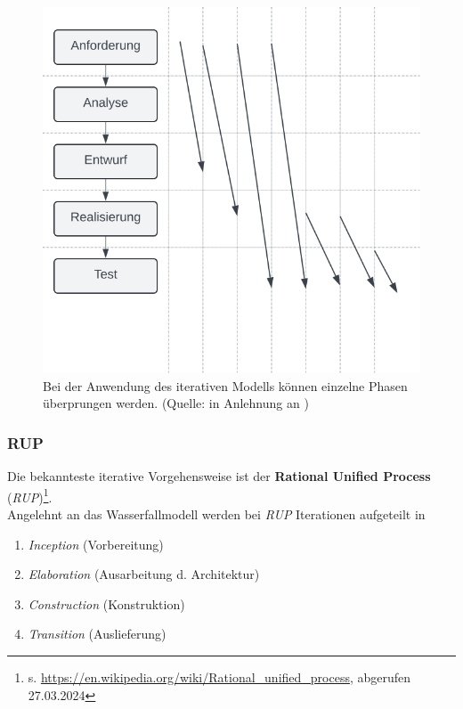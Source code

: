 \begin{figure}
    \centering
    \includegraphics[scale=0.4]{chapters/Prozessmodelle/img/iterativ}
    \caption{Bei der Anwendung des iterativen Modells können einzelne Phasen überprungen werden. (Quelle: in Anlehnung an \cite[28, Abb. 3.3]{Wed09})}
    \label{fig:iterativ}
\end{figure}

\subsubsection*{RUP}
Die bekannteste iterative Vorgehensweise ist der \textbf{Rational Unified Process} (\textit{RUP})\footnote{
    s. \url{https://en.wikipedia.org/wiki/Rational_unified_process}, abgerufen 27.03.2024
}.\\
Angelehnt an das Wasserfallmodell werden bei \textit{RUP} Iterationen aufgeteilt in

\begin{enumerate}
    \item \textit{Inception} (Vorbereitung)
    \item \textit{Elaboration} (Ausarbeitung d. Architektur)
    \item \textit{Construction} (Konstruktion)
    \item \textit{Transition} (Auslieferung)
\end{enumerate}

